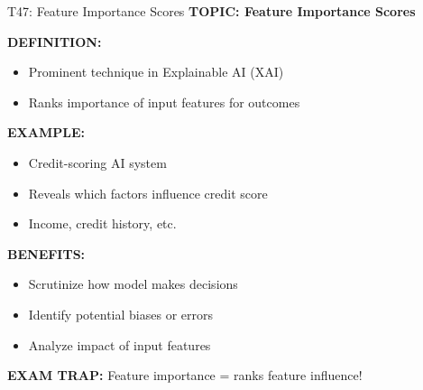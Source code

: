 \documentclass[8pt]{beamer}
\begin{document}
	\begin{frame}{T47: Feature Importance Scores}
		\fontsize{6.5}{7.5}\selectfont
		\textbf{TOPIC: Feature Importance Scores}
		
		\vspace{0.1cm}
		\textbf{DEFINITION:}
		\begin{itemize}
			\item Prominent technique in Explainable AI (XAI)
			\item Ranks importance of input features for outcomes
		\end{itemize}
		
		\vspace{0.1cm}
		\textbf{EXAMPLE:}
		\begin{itemize}
			\item Credit-scoring AI system
			\item Reveals which factors influence credit score
			\item Income, credit history, etc.
		\end{itemize}
		
		\vspace{0.1cm}
		\textbf{BENEFITS:}
		\begin{itemize}
			\item Scrutinize how model makes decisions
			\item Identify potential biases or errors
			\item Analyze impact of input features
		\end{itemize}
		
		\textcolor{myred}{\textbf{EXAM TRAP:}} Feature importance = \textcolor{myblue}{ranks feature influence}!
	\end{frame}
	
\end{document}
